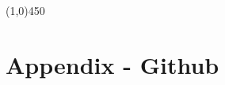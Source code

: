 \documentclass[11pt,a4paper,notitlepage]{article}
\begin{document}
	
\begin{center}
\line(1,0){450}
\end{center}

\newpage
\section{Appendix - Github}
\label{section:github}
\end{document}
